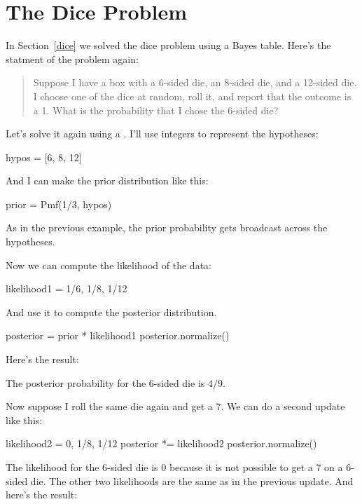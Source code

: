 \documentclass[12pt]{book}
\theoremstyle{exercise}
\begin{document}
\section{The Dice Problem}

In Section~\ref{dice} we solved the dice problem using a Bayes table.
Here's the statment of the problem again:

\begin{quote}
Suppose I have a box with a 6-sided die, an 8-sided die, and a 12-sided die.
I choose one of the dice at random, roll it, and report that the outcome is a 1.
What is the probability that I chose the 6-sided die?
\end{quote}

Let's solve it again using a .
I'll use integers to represent the hypotheses:

\begin{code}
hypos = [6, 8, 12]
\end{code}

And I can make the prior distribution like this:

\begin{code}
prior = Pmf(1/3, hypos)
\end{code}

As in the previous example, the prior probability gets broadcast across the hypotheses.

Now we can compute the likelihood of the data:

\begin{code}
likelihood1 = 1/6, 1/8, 1/12
\end{code}

And use it to compute the posterior distribution.

\begin{code}
posterior = prior * likelihood1
posterior.normalize()
\end{code}

Here's the result:



The posterior probability for the 6-sided die is $4/9$.

Now suppose I roll the same die again and get a $7$.
We can do a second update like this:

\begin{code}
likelihood2 = 0, 1/8, 1/12
posterior *= likelihood2
posterior.normalize()
\end{code}

The likelihood for the 6-sided die is $0$ because it is not possible to get a 7 on a 6-sided die.
The other two likelihoods are the same as in the previous update.
And here's the result:
\end{document}
